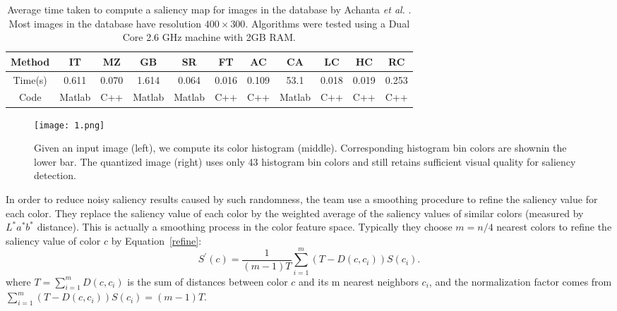 \documentclass[10pt,twocolumn,letterpaper]{article}
\begin{document}
\begin{table*}
	\caption{Average time taken to compute a saliency map for images in the database by Achanta \emph{et al.} \cite{Achanta2009Frequency}. Most images in the database have resolution $400\times 300$. Algorithms were tested using a Dual Core 2.6 GHz machine with 2GB RAM.}\label{t1}
	\begin{center}
		\begin{tabular}{c|c|c|c|c|c|c|c|c|c|c}
			\hline
			Method & IT\cite{Itti1998A}& MZ\cite{Ma2003Contrast}& GB\cite{Sch2006Graph}& SR\cite{Hou2007Saliency}& FT\cite{Achanta2009Frequency}& AC\cite{Achanta2008Salient}& CA\cite{Goferman2012Context}& LC\cite{Zhai2006Visual}& HC& RC \\
			\hline
			Time(s) & 0.611& 0.070& 1.614& 0.064& 0.016& 0.109& 53.1& 0.018& 0.019& 0.253 \\
			\hline
			Code & Matlab& C++& Matlab& Matlab& C++& C++& Matlab& C++& C++& C++ \\
			\hline
		\end{tabular}
	\end{center}
\end{table*}

\begin{figure}
	\begin{center}
		\texttt{[image: 1.png]}
	\end{center}
	\caption{Given an input image (left), we compute its color histogram (middle). Corresponding histogram bin colors are shownin the lower bar. The quantized image (right) uses only 43 histogram bin colors and still retains sufficient visual quality for saliency detection.}
	\label{fig:1}
\end{figure}

In order to reduce noisy saliency results caused by such randomness, the team use a smoothing procedure to refine the saliency value for each color. They replace the saliency value of each color by the weighted average of the saliency values of similar colors (measured by $L^*a^*b^*$ distance). This is actually a smoothing process in the color feature space. Typically they choose $m = n/4$ nearest colors to refine the saliency value of color $c$ by Equation~\ref{refine}:
\begin{equation}
S^\prime(c)=\frac{1}{(m-1)T}\sum_{i=1}^{m}(T-D(c,c_i))S(c_i).   \label{refine}
\end{equation}
where $T = \sum_{i=1}^{m}D(c,c_i)$ is the sum of distances between color $c$ and its m nearest neighbors $c_i$, and the normalization factor comes from $\sum_{i=1}^{m}(T-D(c,c_i))S(c_i)=(m-1)T$.
\end{document}
